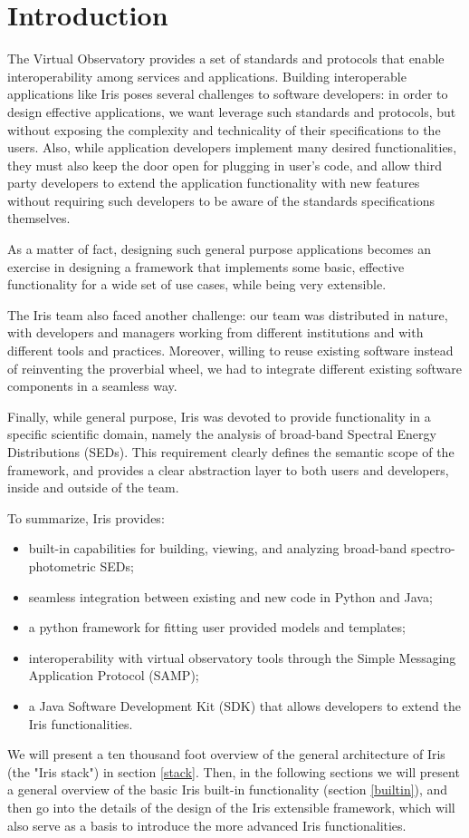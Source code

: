 \section{Introduction} 
The Virtual Observatory provides a set of standards and protocols that enable interoperability among services and applications. Building interoperable applications like Iris poses several challenges to software developers:  in order to design effective applications, we want leverage such standards and protocols, but without exposing the complexity and technicality of their specifications to the users. Also, while application developers implement many desired functionalities, they must also keep the door open for plugging in user's code, and allow third party developers to extend the application functionality with new features without requiring such developers to be aware of the standards specifications themselves.

As a matter of fact, designing such general purpose applications becomes an exercise in designing a framework that implements some basic, effective functionality for a wide set of use cases, while being very extensible.

The Iris team also faced another challenge: our team was distributed in nature, with developers and managers working from different institutions and with different tools and practices. Moreover, willing to reuse existing software instead of reinventing the proverbial wheel, we had to integrate different existing software components in a seamless way.

Finally, while general purpose, Iris was devoted to provide functionality in a specific scientific domain, namely the analysis of broad-band Spectral Energy Distributions (SEDs). This requirement clearly defines the semantic scope of the framework, and provides a clear abstraction layer to both users and developers, inside and outside of the team.

To summarize, Iris provides:
\begin{itemize}
\item built-in capabilities for building, viewing, and analyzing broad-band spectro-photometric SEDs;
\item seamless integration between existing and new code in Python and Java;
\item a python framework for fitting user provided models and templates;
\item interoperability with virtual observatory tools through the Simple Messaging Application Protocol (SAMP);
\item a Java Software Development Kit (SDK) that allows developers to extend the Iris functionalities.
\end{itemize}

We will present a ten thousand foot overview of the general architecture of Iris (the "Iris stack") in section \ref{stack}. Then, in the following sections we will present a general overview of the basic Iris built-in functionality (section \ref{builtin}), and then go into the details of the design of the Iris extensible framework, which will also serve as a basis to introduce the more advanced Iris functionalities.